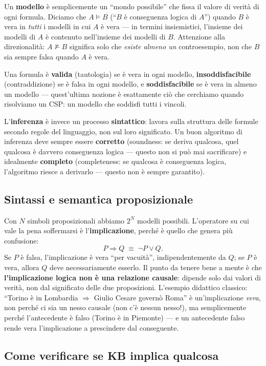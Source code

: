 \documentclass[11pt,a4paper]{article}
\begin{document}
Un \textbf{modello} è semplicemente un ``mondo possibile'' che fissa il valore di verità di ogni formula. Diciamo che $A \models B$ (``$B$ è conseguenza logica di $A$'') quando $B$ è vera in \emph{tutti} i modelli in cui $A$ è vera --- in termini insiemistici, l'insieme dei modelli di $A$ è contenuto nell'insieme dei modelli di $B$. Attenzione alla direzionalità: $A \not\models B$ significa solo che \emph{esiste almeno un} controesempio, non che $B$ sia sempre falsa quando $A$ è vera.

Una formula è \textbf{valida} (tautologia) se è vera in ogni modello, \textbf{insoddisfacibile} (contraddizione) se è falsa in ogni modello, e \textbf{soddisfacibile} se è vera in almeno un modello --- quest'ultima nozione è esattamente ciò che cerchiamo quando risolviamo un CSP: un modello che soddisfi tutti i vincoli.

L'\textbf{inferenza} è invece un processo \textbf{sintattico}: lavora sulla struttura delle formule secondo regole del linguaggio, non sul loro significato. Un buon algoritmo di inferenza deve sempre essere \textbf{corretto} (soundness: se deriva qualcosa, quel qualcosa è davvero conseguenza logica --- questo non si può mai sacrificare) e idealmente \textbf{completo} (completeness: se qualcosa è conseguenza logica, l'algoritmo riesce a derivarlo --- questo non è sempre garantito).

\subsection{Sintassi e semantica proposizionale}

Con $N$ simboli proposizionali abbiamo $2^N$ modelli possibili. L'operatore su cui vale la pena soffermarsi è l'\textbf{implicazione}, perché è quello che genera più confusione:
\[
P \Rightarrow Q \;\equiv\; \neg P \vee Q.
\]
Se $P$ è falsa, l'implicazione è vera ``per vacuità'', indipendentemente da $Q$; se $P$ è vera, allora $Q$ deve necessariamente esserlo. Il punto da tenere bene a mente è che \textbf{l'implicazione logica non è una relazione causale}: dipende solo dai valori di verità, non dal significato delle due proposizioni. L'esempio didattico classico: ``Torino è in Lombardia $\Rightarrow$ Giulio Cesare governò Roma'' è un'implicazione \emph{vera}, non perché ci sia un nesso causale (non c'è nessun nesso!), ma semplicemente perché l'antecedente è falso (Torino è in Piemonte) --- e un antecedente falso rende vera l'implicazione a prescindere dal conseguente.

\subsection{Come verificare se KB implica qualcosa}
\end{document}
